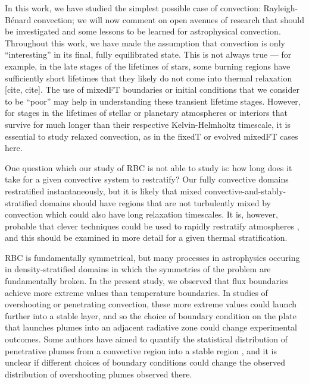 \documentclass[aps, pre, onecolumn, nofootinbib, notitlepage, groupedaddress, amsfonts, amssymb, amsmath, longbibliography]{revtex4-1}
\newcommand{\RB}{Rayleigh-B\'{e}nard }
\begin{document}
In this work, we have studied the simplest possible case of convection: \RB convection; we will now comment on open avenues of research that should be investigated and some lessons to be learned for astrophysical convection.
Throughout this work, we have made the assumption that convection is only ``interesting'' in its final, fully equilibrated state.
This is not always true --- for example, in the late stages of the lifetimes of stars, some burning regions have sufficiently short lifetimes that they likely do not come into thermal relaxation [cite, cite].
The use of mixedFT boundaries or initial conditions that we consider to be ``poor'' may help in understanding these transient lifetime stages.
However, for stages in the lifetimes of stellar or planetary atmospheres or interiors that survive for much longer than their respective Kelvin-Helmholtz timescale, it is essential to study relaxed convection, as in the fixedT or evolved mixedFT cases here.

One question which our study of RBC is not able to study is: how long does it take for a given convective system to restratify?
Our fully convective domains restratified instantaneously, but it is likely that mixed convective-and-stably-stratified domains should have regions that are not turbulently mixed by convection which could also have long relaxation timescales.
It is, however, probable that clever techniques could be used to rapidly restratify atmospheres \cite{anders&all2018}, and this should be examined in more detail for a given thermal stratification.

RBC is fundamentally symmetrical, but many processes in astrophysics occuring in density-stratified domains in which the symmetries of the problem are fundamentally broken.
In the present study, we observed that flux boundaries achieve more extreme values than temperature boundaries.
In studies of overshooting or penetrating convection, these more extreme values could launch further into a stable layer, and so the choice of boundary condition on the plate that launches plumes into an adjacent radiative zone could change experimental outcomes.
Some authors have aimed to quantify the statistical distribution of penetrative plumes from a convective region into a stable region \cite{pratt&all2017, korre&all2019}, and it is unclear if different choices of boundary conditions could change the observed distribution of overshooting plumes observed there.
\end{document}
